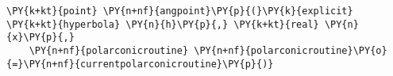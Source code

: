 \begin{Verbatim}[commandchars=\\\{\}]
    \PY{k+kt}{point} \PY{n+nf}{angpoint}\PY{p}{(}\PY{k}{explicit} \PY{k+kt}{hyperbola} \PY{n}{h}\PY{p}{,} \PY{k+kt}{real} \PY{n}{x}\PY{p}{,}
    \PY{n+nf}{polarconicroutine} \PY{n+nf}{polarconicroutine}\PY{o}{=}\PY{n+nf}{currentpolarconicroutine}\PY{p}{)}
\end{Verbatim}
